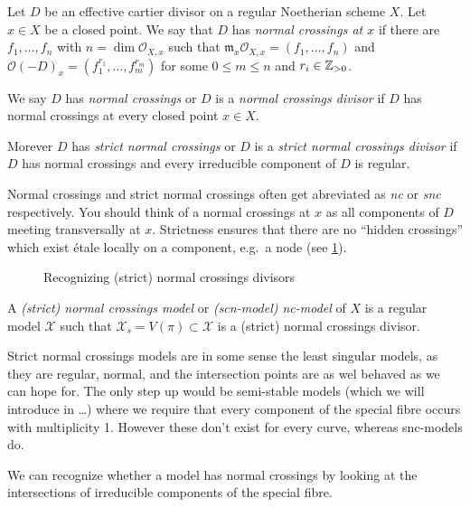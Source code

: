 \begin{definition}
	Let $D$ be an effective cartier divisor on a regular Noetherian scheme $X$. 	Let $x \in X$ be a closed point. 
	We say that $D$ has \emph{normal crossings at $x$ } if there are $f_1, \ldots, f_n$ with $n = \dim \mathcal{O}_{X, x}$ such that $\mathfrak{m} _x \mathcal{O}_{X, x} = (f_1, \ldots, f_n)$ and $\mathcal{O}(-D)_{x} = (f_1^{r_1}, \ldots, f_m^{r_m})$ for some $0 \le m \le n$ and $r_i \in \mathbb{Z}_{> 0}$. 

	We say $D$ has \emph{normal crossings} or $D$ is a \emph{normal crossings divisor} if $D$ has normal crossings at every closed point  $x \in X$. 

	Morever  $D$ has \emph{strict normal crossings} or $D$ is a \emph{strict normal crossings divisor} if $D$ has normal crossings and every irreducible component of $D$ is regular. 
\end{definition}
Normal crossings and strict normal crossings often get abreviated as \emph{nc} or \emph{snc} respectively.
You should think of a normal crossings at $x$ as all components of $D$ meeting transversally at $x$. 
Strictness ensures that there are no ``hidden crossings'' which exist étale locally on a component, e.g.\ a node (see \cref{fig:normal_crossings_divisors}).

\begin{figure}[ht]
    \centering
    \caption{Recognizing (strict) normal crossings divisors}
    \label{fig:normal_crossings_divisors}
\end{figure}
\begin{definition}
	A \emph{(strict) normal crossings model} or \emph{(scn-model) nc-model}  of $X$ is a regular model $\mathscr X$ such that $\mathscr X_s = V(\pi) \subset  \mathscr X$ is a (strict) normal crossings divisor. 
\end{definition}

Strict normal crossings models are in some sense the least singular models, as they are regular, normal, and the intersection points are as wel behaved as we can hope for. 
The only step up would be semi-stable models (which we will introduce in \ldots {}) where we require that every component of the special fibre occurs with multiplicity 1. 
However these don't exist for every curve, whereas snc-models do.

We can recognize whether a model has normal crossings by looking at the intersections of irreducible components of the special fibre. 

